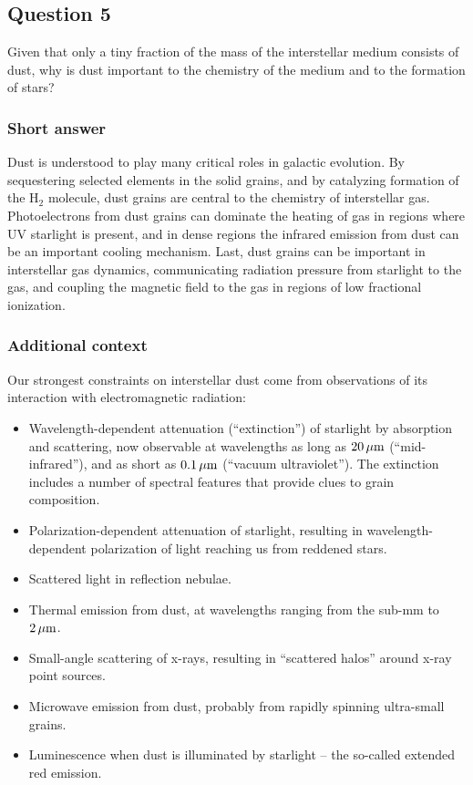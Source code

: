 \documentclass[a4paper,10pt]{article}
\begin{document}
\newpage
\subsection{Question 5}

Given that only a tiny fraction of the mass of the interstellar medium consists of dust, why is dust important to the chemistry of the medium and to the formation of stars?

\subsubsection{Short answer}

Dust is understood to play many critical roles in galactic evolution. By sequestering selected elements in the solid grains, and by catalyzing formation of the H$_2$ molecule, dust grains are central to the chemistry of interstellar gas. Photoelectrons from dust grains can dominate the heating of gas in regions where UV starlight is present, and in dense regions the infrared emission from dust can be an important cooling mechanism. Last, dust grains can be important in interstellar gas dynamics, communicating radiation pressure from starlight to the gas, and coupling the magnetic field to the gas in regions of low fractional ionization.

\subsubsection{Additional context}

Our strongest constraints on interstellar dust come from observations of its interaction with electromagnetic radiation:

\begin{itemize}
    \item Wavelength-dependent attenuation (``extinction'') of starlight by absorption and scattering, now observable at wavelengths as long as $20\,\mu{\rm m}$ (``mid-infrared''), and as short as $0.1\,\mu{\rm m}$ (``vacuum ultraviolet''). The extinction includes a number of spectral features that provide clues to grain composition.
    \item Polarization-dependent attenuation of starlight, resulting in wavelength-dependent polarization of light reaching us from reddened stars.
    \item Scattered light in reflection nebulae.
    \item Thermal emission from dust, at wavelengths ranging from the sub-mm to $2\,\mu{\rm m}$.
    \item Small-angle scattering of x-rays, resulting in ``scattered halos'' around x-ray point sources.
    \item Microwave emission from dust, probably from rapidly spinning ultra-small grains.
    \item Luminescence when dust is illuminated by starlight -- the so-called extended red emission.
\end{itemize}
\end{document}
